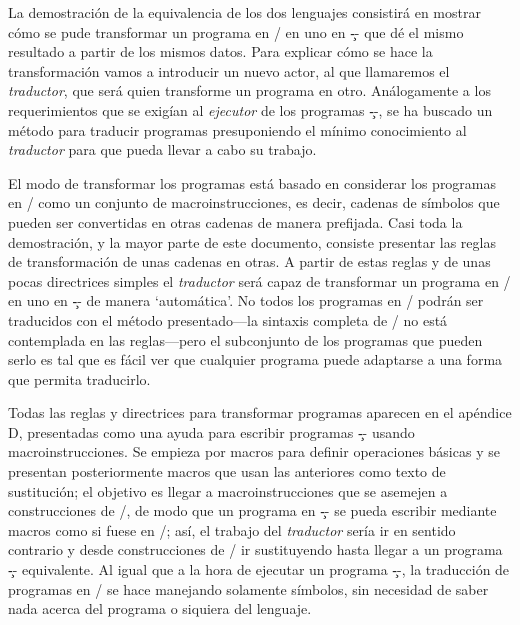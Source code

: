 \newcount\piecab {}
La demostración de la equivalencia de los dos lenguajes consistirá en mostrar cómo se pude
transformar un programa en \C/ en uno en \c-- que dé el mismo resultado a partir de los mismos
datos. Para explicar cómo se hace la transformación vamos a introducir un nuevo actor, al que
llamaremos el {\it traductor}, que será quien transforme un programa en otro. Análogamente a los
requerimientos que se exigían al {\it ejecutor} de los programas \c--, se ha buscado un método para
traducir programas presuponiendo el mínimo conocimiento al {\it traductor} para que pueda llevar a
cabo su trabajo.

El modo de transformar los programas está basado en considerar los programas en \C/ como un conjunto
de macroinstrucciones, es decir, cadenas de símbolos que pueden ser convertidas en otras cadenas de
manera prefijada. Casi toda la demostración, y la mayor parte de este documento, consiste presentar
las reglas de transformación de unas cadenas en otras. A partir de estas reglas y de unas pocas
directrices simples el {\it traductor} será capaz de transformar un programa en \C/ en uno en \c--
de manera ‘automática’. No todos los programas en \C/ podrán ser traducidos con el método
presentado---la sintaxis completa de \C/ no está contemplada en las reglas---pero el subconjunto de los
programas que pueden serlo es tal que es fácil ver que cualquier programa puede adaptarse a una
forma que permita traducirlo.


Todas las reglas y directrices para transformar programas aparecen en el apéndice D, presentadas
como una ayuda para escribir programas \c-- usando macroinstrucciones. Se empieza por macros para
definir operaciones básicas y se presentan posteriormente macros que usan las anteriores como texto
de sustitución; el objetivo es llegar a macroinstrucciones que se asemejen a construcciones de \C/,
de modo que un programa en \c-- se pueda escribir mediante macros como si fuese en \C/; así, el
trabajo del {\it traductor} sería ir en sentido contrario y desde construcciones de \C/ ir
sustituyendo hasta llegar a un programa \c-- equivalente. Al igual que a la hora de ejecutar un
programa \c--, la traducción de programas en \C/ se hace manejando solamente símbolos, sin necesidad
de saber nada acerca del programa o siquiera del lenguaje.


